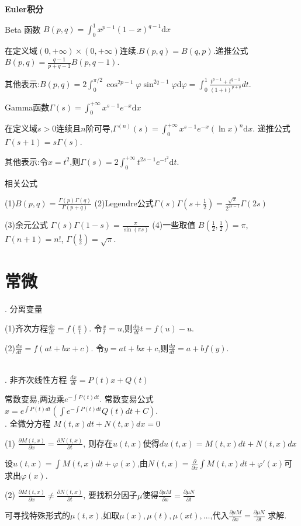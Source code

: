 \documentclass[UTF8]{ctexart}
\begin{document}
\noindent \textbf{Euler积分}\par 
\noindent Beta 函数 $B(p,q)=\int _0^1 x^{p-1}(1-x)^{q-1}\mathrm{d}x$\par 
在定义域$(0,+\infty)\times(0,+\infty)$连续.$B(p,q)=B(q,p)$.递推公式$B(p,q)=\frac{q-1}{p+q-1}B(p,q-1)$.\par 
其他表示:$B(p, q)=2 \int_{0}^{\pi / 2} \cos ^{2p-1} \varphi \sin ^{2q-1}\varphi \mathrm{d} \varphi
=\int_0^1 \frac{t^{p-1}+t^{q-1}}{(1+t)^{p+q}} dt$.\par 

\noindent Gamma函数$\Gamma(s)=\int _0^{+\infty}x^{s-1}e^{-x}\mathrm{d}x$ \par 
在定义域$s>0$连续且$n$阶可导,$\Gamma^{(n)}(s)=\int _0^{+\infty}x^{s-1}e^{-x}(\ln x)^n\mathrm{d}x$.
递推公式$\Gamma (s+1)=s\Gamma(s)$.\par 
其他表示:令$x=t^2$,则$\Gamma(s)=2\int _0^{+\infty}t^{2s-1}e^{-t^2}\mathrm{d}t$.

\noindent 相关公式\par 
(1)$B(p,q)=\frac{\Gamma(p)\Gamma(q)}{\Gamma(p+q)}$ \qquad 
(2)Legendre公式\quad $\Gamma(s)\Gamma(s+\frac{1}{2})=\frac{\sqrt{\pi}}{2^{2s-1}}\Gamma(2s)$\par 
(3)余元公式  $\Gamma(s)\Gamma(1-s)=\frac{\pi}{\sin (\pi s)}$ \qquad 
(4)一些取值 $B(\frac{1}{2},\frac{1}{2})=\pi$, $\Gamma(n+1)=n!$, $\Gamma(\frac{1}{2})=\sqrt{\pi }$.


\section{常微}

. 分离变量 \par
(1)齐次方程$\frac{dx}{dt}=f(\frac{x}{t})$. 令$\frac{x}{t}=u$,则$\frac{du}{dt}t=f(u)-u$.\par
(2)$\frac{dx}{dt}=f(at+bx+c)$. 令$y=at+bx+c$,则$\frac{dy}{dt}=a+bf(y)$.\par
~\\

. 非齐次线性方程 $\frac{dx}{dt}=P(t)x+Q(t)$\par
常数变易,两边乘$e^{-\int P(t)dt}$. 常数变易公式$x=e^{\int P(t)dt}(\int e^{-\int P(t)dt}Q(t)dt+C)$.
~\\


. 全微分方程 $M(t,x)dt+N(t,x)dx=0$ \par
(1) $\frac{\partial M(t,x)}{\partial x}=\frac{\partial N(t,x)}{\partial t}$, 则存在$u(t,x)$使得$du(t,x)=M(t,x)dt+N(t,x)dx$\par
设$u(t,x)=\int M(t,x)dt+\varphi(x)$,由$N(t,x)=\frac{\partial }{\partial x}\int M(t,x)dt+\varphi'(x)$可求出$\varphi(x)$. \par
(2) $\frac{\partial M(t,x)}{\partial x} \neq \frac{\partial N(t,x)}{\partial t}$,
要找积分因子$\mu$使得$\frac{\partial \mu M}{\partial x}=\frac{\partial \mu N}{\partial t}$ \par
可寻找特殊形式的$\mu(t,x) $,如取$\mu (x),\mu (t),\mu (xt),\dots $,代入$\frac{\partial \mu M}{\partial x}=\frac{\partial \mu N}{\partial t}$ 求解.
~\\
\end{document}
